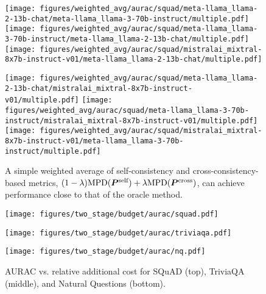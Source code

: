 \begin{figure}[!t]
\centering
\texttt{[image: figures/weighted\_avg/aurac/squad/meta-llama\_llama-2-13b-chat/meta-llama\_llama-3-70b-instruct/multiple.pdf]}
\texttt{[image: figures/weighted\_avg/aurac/squad/meta-llama\_llama-3-70b-instruct/meta-llama\_llama-2-13b-chat/multiple.pdf]}
\texttt{[image: figures/weighted\_avg/aurac/squad/mistralai\_mixtral-8x7b-instruct-v01/meta-llama\_llama-2-13b-chat/multiple.pdf]}

\texttt{[image: figures/weighted\_avg/aurac/squad/meta-llama\_llama-2-13b-chat/mistralai\_mixtral-8x7b-instruct-v01/multiple.pdf]}
\texttt{[image: figures/weighted\_avg/aurac/squad/meta-llama\_llama-3-70b-instruct/mistralai\_mixtral-8x7b-instruct-v01/multiple.pdf]}
\texttt{[image: figures/weighted\_avg/aurac/squad/mistralai\_mixtral-8x7b-instruct-v01/meta-llama\_llama-3-70b-instruct/multiple.pdf]}
\caption{A simple weighted average of self-consistency and cross-consistency-based metrics, $(1-\lambda) \text{MPD}({\bm{P}}^{\text{self}}) + \lambda \text{MPD}({\bm{P}}^{\text{cross}})$, can achieve performance close to that of the oracle method.}
\label{fig: weighted_avg_aurac}
\end{figure}


\begin{figure*}[!t]
    \centering
    \texttt{[image: figures/two\_stage/budget/aurac/squad.pdf]}
    
    \texttt{[image: figures/two\_stage/budget/aurac/triviaqa.pdf]}

    \texttt{[image: figures/two\_stage/budget/aurac/nq.pdf]}
    \caption{ AURAC vs. relative additional cost for SQuAD (top), TriviaQA (middle), and Natural Questions (bottom).  }
    \label{fig: budget_aurac}
\end{figure*}
